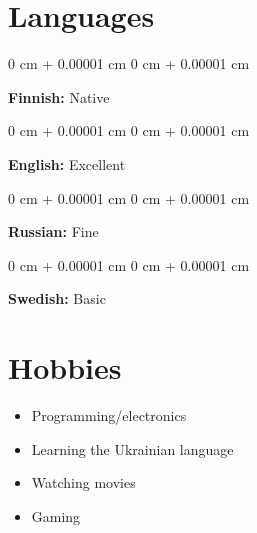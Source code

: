 \documentclass{article}
\newenvironment{highlights}{
    \begin{itemize}[
        topsep=0.10 cm,
        parsep=0.10 cm,
        partopsep=0pt,
        itemsep=0pt,
        leftmargin=0 cm + 10pt
    ]
}{
    \end{itemize}
}
\newenvironment{onecolentry}{
    \begin{adjustwidth}{
        0 cm + 0.00001 cm
    }{
        0 cm + 0.00001 cm
    }
}{
    \end{adjustwidth}
}
\begin{document}
  \section{Languages}
    \begin{onecolentry}
      \textbf{Finnish:} Native
    \end{onecolentry}
    \vspace{0.1 cm}
    \begin{onecolentry}
      \textbf{English:} Excellent
    \end{onecolentry}
    \vspace{0.1 cm}
    \begin{onecolentry}
      \textbf{Russian:} Fine
    \end{onecolentry}
    \vspace{0.1 cm}
    \begin{onecolentry}
      \textbf{Swedish:} Basic
    \end{onecolentry}
    \vspace{0.1 cm}
  \section{Hobbies}
    \begin{highlights}
      \item Programming/electronics
      \item Learning the Ukrainian language
      \item Watching movies
      \item Gaming
    \end{highlights}
\end{document}
